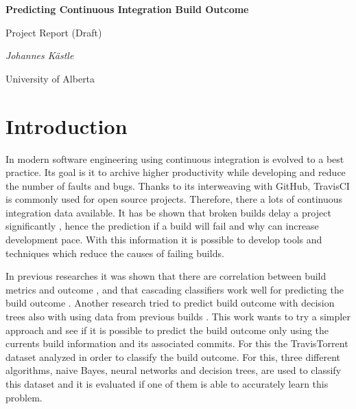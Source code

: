 \documentclass[a4paper,11pt]{article}
\begin{document}
	
	\begin{center}
	{\huge\bfseries Predicting Continuous Integration Build Outcome \par}
	{\Large Project Report (Draft)\par}
	
	\vspace{1cm}
	{\Large\itshape Johannes Kästle\par}
	{ University of Alberta \par}
	\end{center}


\setlength{\parindent}{0pt}
\setlength{\parskip}{1.5ex plus0.5ex minus0.5ex}

\begin{abstract}
	In order to improve developers productivity and increase pace, it is tried to predict the outcome of continuous integration builds. For that, $2,500,756$ builds were analyzed, using three different machine learning algorithms with over $700$ configurations. Generally, all algorithms struggled with predicting faults, but had high sensitivity. In the end, the decision tree classifier could predict the outcome with an accuracy of $76\%$ and performed significantly better than its competitors. 
\end{abstract}

\section{Introduction}

In modern software engineering using continuous integration is evolved to a best practice. Its goal is it to archive higher productivity while developing and reduce the number of faults and bugs. Thanks to its interweaving with GitHub, TravisCI is commonly used for open source projects. Therefore, there a lots of continuous integration data available. It has be shown that broken builds delay a project significantly \cite{CIDelay}, hence the prediction if a build will fail and why can increase development pace. With this information it is possible to develop tools and techniques which reduce the causes of failing builds. 

In previous researches it was shown that there are correlation between build metrics and outcome \cite{correlation}, and that cascading classifiers work well for predicting the build outcome \cite{cascade}. Another research tried to predict build outcome with decision trees also with using data from previous builds \cite{treeTimes}. This work wants to try a simpler approach and see if it is possible to predict the build outcome only using the currents build information and its associated commits. For this the TravisTorrent \cite{msr17challenge} dataset analyzed in order to classify the build outcome. For this, three different algorithms, naive Bayes, neural networks and decision trees, are used to classify this dataset and it is evaluated if one of them is able to accurately learn this problem. 
\end{document}
